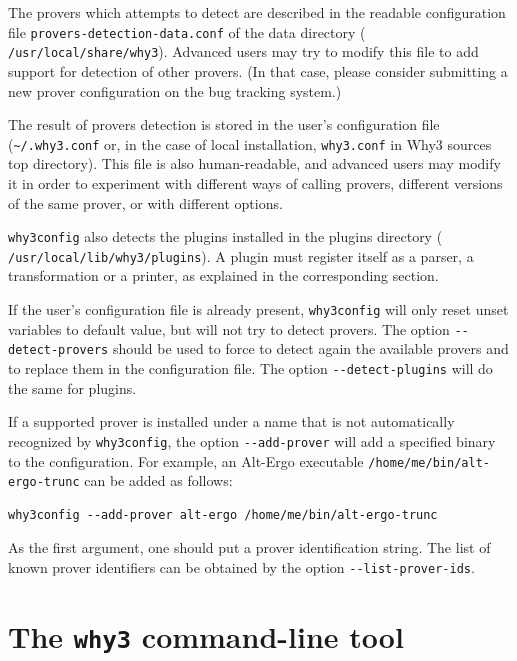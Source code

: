 The provers which \why attempts to detect are described in
the readable configuration file \texttt{provers-detection-data.conf}
of the \why data directory (\eg{}
\texttt{/usr/local/share/why3}). Advanced users may try to modify this
file to add support for detection of other provers. (In that case,
please consider submitting a new prover configuration on the bug
tracking system.)

The result of provers detection is stored in the user's
configuration file (\verb+~/.why3.conf+ or, in the case of local
installation, \verb+why3.conf+ in Why3 sources top directory). This file
is also human-readable, and advanced users may modify it in order to
experiment with different ways of calling provers, \eg{} different
versions of the same prover, or with different options.

\texttt{why3config} also detects the plugins installed in the \why
plugins directory (\eg{} \texttt{/usr/local/lib/why3/plugins}). A
plugin must register itself as a parser, a transformation or a
printer, as explained in the corresponding section.

If the user's configuration file is already present,
\texttt{why3config} will only reset unset variables to default value,
but will not try to detect provers.
The option \verb|--detect-provers| should be used to force
\why to detect again the available
provers and to replace them in the configuration file. The option
\verb|--detect-plugins| will do the same for plugins.

If a supported prover is installed under a name
that is not automatically recognized by \texttt{why3config},
the option \verb|--add-prover| will add a specified binary
to the configuration. For example, an Alt-Ergo executable
\verb|/home/me/bin/alt-ergo-trunc| can be added as follows:
\begin{verbatim}
why3config --add-prover alt-ergo /home/me/bin/alt-ergo-trunc
\end{verbatim}
As the first argument, one should put a prover
identification string. The list of known prover identifiers
can be obtained by the option \verb|--list-prover-ids|.

\section{The \texttt{why3} command-line tool}
\label{sec:why3ref}


